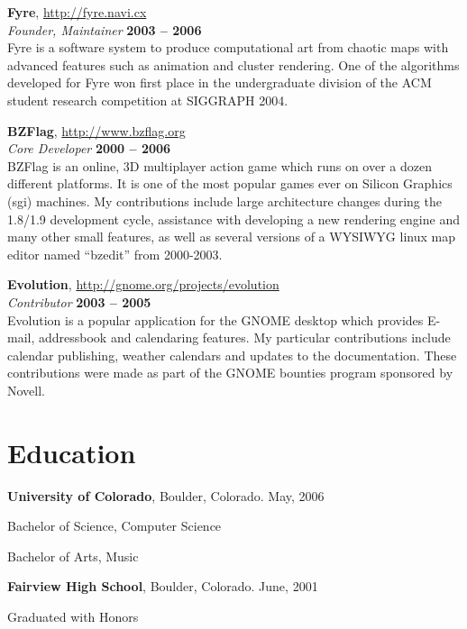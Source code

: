 \documentclass[margin,line]{resume}
\begin{document}
\begin{resume}
    {\bf Fyre}, \url{http://fyre.navi.cx} \vspace{2mm}\\\vspace{1mm}%
    {\sl Founder, Maintainer} \hfill {\bf 2003 -- 2006}\\
    Fyre is a software system to produce computational art from chaotic maps
    with advanced features such as animation and cluster rendering.  One of the
    algorithms developed for Fyre won first place in the undergraduate division
    of the ACM student research competition at SIGGRAPH 2004.

    \ifcv
        {\bf BZFlag}, \url{http://www.bzflag.org} \vspace{2mm}\\\vspace{1mm}%
        {\sl Core Developer} \hfill {\bf 2000 -- 2006}\\
        BZFlag is an online, 3D multiplayer action game which runs on over a dozen
        different platforms.  It is one of the most popular games ever on Silicon
        Graphics (sgi) machines. My contributions include large architecture changes
        during the 1.8/1.9 development cycle, assistance with developing a new
        rendering engine and many other small features, as well as several versions
        of a WYSIWYG linux map editor named “bzedit” from 2000-2003.

        {\bf Evolution}, \url{http://gnome.org/projects/evolution} \vspace{2mm}\\\vspace{1mm}%
        {\sl Contributor} \hfill {\bf 2003 -- 2005}\\
        Evolution is a popular application for the GNOME desktop which provides
        E-mail, addressbook and calendaring features.  My particular contributions
        include calendar publishing, weather calendars and updates to the
        documentation.  These contributions were made as part of the GNOME bounties
        program sponsored by Novell.
    \fi


    \section{\mysidestyle Education}

    {\bf University of Colorado}, Boulder, Colorado.  May, 2006 \vspace{2mm}%
    \begin{list1}
    \item[] Bachelor of Science, Computer Science
    \item[] Bachelor of Arts, Music
    \end{list1}
    \ifcv
        {\bf Fairview High School}, Boulder, Colorado.  June, 2001 \vspace{2mm}%
        \begin{list1}
        \item[] Graduated with Honors
        \end{list1}
    \fi



\end{resume}
\end{document}

